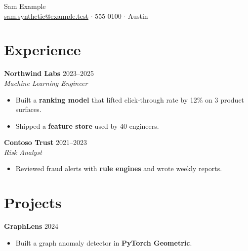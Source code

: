 \documentclass[10pt]{article}
\newcommand{\roleentry}[3]{\par\noindent\textbf{#1} \hfill #2\\\textit{#3}\par}
\newcommand{\projectentry}[2]{\par\noindent\textbf{#1} \hfill #2\par}
\newcommand{\sectionrule}[1]{\section*{#1}}
\newenvironment{cvitems}{\begin{itemize}\setlength\itemsep{0pt}}{\end{itemize}}
\begin{document}
\begin{center}{\Large Sam Example}\\ \href{mailto:sam.synthetic@example.test}{sam.synthetic@example.test} $\cdot$ 555-0100 $\cdot$ Austin\end{center}
\sectionrule{Experience}
\roleentry{Northwind Labs}{2023--2025}{Machine Learning Engineer}
\begin{cvitems}
\item Built a \textbf{ranking model} that lifted click-through rate by 12\% on 3 product surfaces.
\item Shipped a \textbf{feature store} used by 40 engineers.
\end{cvitems}
\roleentry{Contoso Trust}{2021--2023}{Risk Analyst}
\begin{cvitems}
\item Reviewed fraud alerts with \textbf{rule engines} and wrote weekly reports.
\end{cvitems}
\sectionrule{Projects}
\projectentry{GraphLens}{2024}
\begin{cvitems}
\item Built a graph anomaly detector in \textbf{PyTorch Geometric}.
\end{cvitems}
\end{document}
